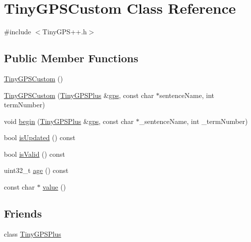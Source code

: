 \hypertarget{class_tiny_g_p_s_custom}{}\section{Tiny\+G\+P\+S\+Custom Class Reference}
\label{class_tiny_g_p_s_custom}


{\ttfamily \#include $<$Tiny\+G\+P\+S++.\+h$>$}

\subsection*{Public Member Functions}
\begin{DoxyCompactItemize}
\item 
\hyperlink{class_tiny_g_p_s_custom_ac82fa99f3bcd9811377dd5fa3e9e98c7}{Tiny\+G\+P\+S\+Custom} ()
\item 
\hyperlink{class_tiny_g_p_s_custom_a29b2a658bf95d8e6265e983b1c0251b5}{Tiny\+G\+P\+S\+Custom} (\hyperlink{class_tiny_g_p_s_plus}{Tiny\+G\+P\+S\+Plus} \&\hyperlink{_weather___balloon_8cpp_a169c53997a7da1d0fb99aec1b4675ce8}{gps}, const char $\ast$sentence\+Name, int term\+Number)
\item 
void \hyperlink{class_tiny_g_p_s_custom_a3bf972f7e2e7e3f483071630e5ca8355}{begin} (\hyperlink{class_tiny_g_p_s_plus}{Tiny\+G\+P\+S\+Plus} \&\hyperlink{_weather___balloon_8cpp_a169c53997a7da1d0fb99aec1b4675ce8}{gps}, const char $\ast$\+\_\+sentence\+Name, int \+\_\+term\+Number)
\item 
bool \hyperlink{class_tiny_g_p_s_custom_a3905509b3f88d67e248855c135744b14}{is\+Updated} () const 
\item 
bool \hyperlink{class_tiny_g_p_s_custom_a06fad8448c014424bf96ed379b55da21}{is\+Valid} () const 
\item 
uint32\+\_\+t \hyperlink{class_tiny_g_p_s_custom_a9bacaf774b1dba9ad942435d3ed1c2cc}{age} () const 
\item 
const char $\ast$ \hyperlink{class_tiny_g_p_s_custom_ac5ad40a3d9b6fe386b2309f972566674}{value} ()
\end{DoxyCompactItemize}
\subsection*{Friends}
\begin{DoxyCompactItemize}
\item 
class \hyperlink{class_tiny_g_p_s_custom_a6501fd5ef19ae166d43e0e5781609ee2}{Tiny\+G\+P\+S\+Plus}
\end{DoxyCompactItemize}



